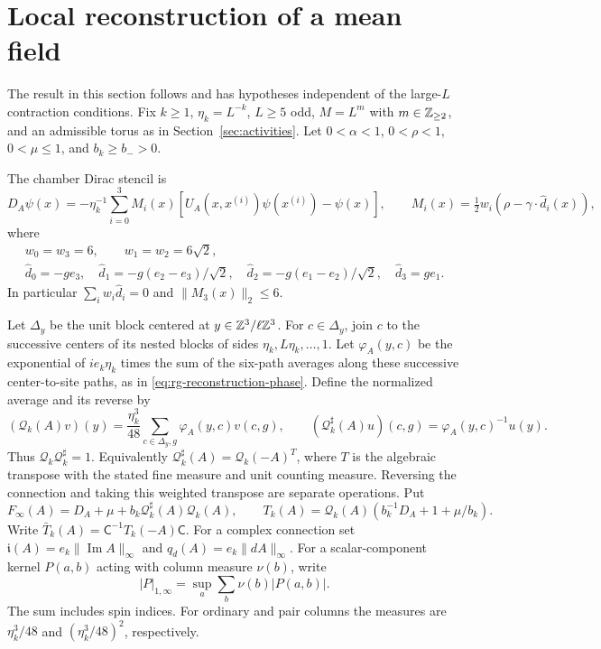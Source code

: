 \section{Local reconstruction of a mean field}
\label{subsec:rg-field-reconstruction}

The result in this section follows
\cite[\S\S12.4,13.4]{QED3Manuscript} and has hypotheses independent
of the large-\(L\) contraction conditions. Fix \(k\ge1\),
\(\eta_k=L^{-k}\), \(L\ge5\) odd, \(M=L^m\) with \(m\in\mathbb Z_{\ge2}\),
and an admissible torus as in Section~\ref{sec:activities}.
Let \(0<\alpha<1\), \(0<\rho<1\), \(0<\mu\le1\), and
\(b_k\ge b_->0\).

The chamber Dirac stencil is
\[
 D_A\psi(x)=-\eta_k^{-1}\sum_{i=0}^3M_i(x)
            [U_A(x,x^{(i)})\psi(x^{(i)})-\psi(x)],
 \qquad
 M_i(x)=\tfrac12w_i(\rho-\gamma\cdot\widehat d_i(x)),
\]
where
\[
 \begin{gathered}
 w_0=w_3=6,\qquad w_1=w_2=6\sqrt2,\\
 \widehat d_0=-ge_3,\quad
 \widehat d_1=-g(e_2-e_3)/\sqrt2,\quad
 \widehat d_2=-g(e_1-e_2)/\sqrt2,\quad
 \widehat d_3=ge_1 .
 \end{gathered}
\]
In particular
\(\sum_iw_i\widehat d_i=0\) and \(\|M_3(x)\|_2\le6\).

Let \(\Delta_y\) be the unit block centered at
\(y\in\mathbb Z^3/\ell\mathbb Z^3\). For \(c\in\Delta_y\), join \(c\) to the
successive centers of its nested blocks of sides
\(\eta_k,L\eta_k,\ldots,1\). Let \(\varphi_A(y,c)\) be the
exponential of \(ie_k\eta_k\) times the sum of the six-path
averages along these successive center-to-site paths, as in
\eqref{eq:rg-reconstruction-phase}. Define the normalized average
and its reverse by
\begin{equation}\label{eq:reconstruction-average}
 (\mathcal Q_k(A)v)(y)
      =\frac{\eta_k^3}{48}\sum_{c\in\Delta_y,g}
                                     \varphi_A(y,c)v(c,g),\qquad
 (\mathcal Q_k^\sharp(A)u)(c,g)=\varphi_A(y,c)^{-1}u(y).
\end{equation}
Thus \(\mathcal Q_k\mathcal Q_k^\sharp=1\).
Equivalently \(\mathcal Q_k^\sharp(A)=\mathcal Q_k(-A)^T\),
where \(T\) is the algebraic transpose with the stated fine
measure and unit counting measure. Reversing the connection and
taking this weighted transpose are separate operations.
Put
\[
 F_\infty(A)=D_A+\mu+b_k\mathcal Q_k^\sharp(A)\mathcal Q_k(A),
 \qquad
 T_k(A)=\mathcal Q_k(A)(b_k^{-1}D_A+1+\mu/b_k).
\]
Write \(\bar T_k(A)=\mathsf C^{-1}T_k(-A)\mathsf C\).
For a complex connection set
\(\mathfrak i(A)=e_k\|\operatorname{Im}A\|_\infty\) and
\(q_d(A)=e_k\|dA\|_\infty\).
For a scalar-component kernel \(P(a,b)\) acting with column
measure \(\nu(b)\), write
\[
 |P|_{1,\infty}=\sup_a\sum_b\nu(b)|P(a,b)|.
\]
The sum includes spin indices. For ordinary and pair columns
the measures are \(\eta_k^3/48\) and \((\eta_k^3/48)^2\),
respectively.

